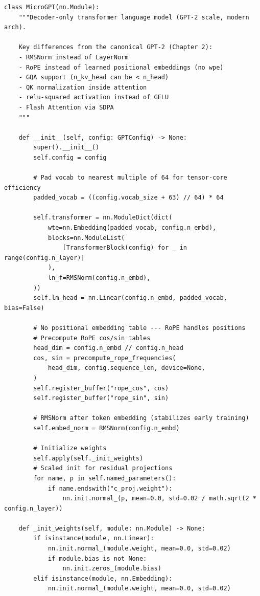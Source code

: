 \begin{lstlisting}
class MicroGPT(nn.Module):
    """Decoder-only transformer language model (GPT-2 scale, modern arch).

    Key differences from the canonical GPT-2 (Chapter 2):
    - RMSNorm instead of LayerNorm
    - RoPE instead of learned positional embeddings (no wpe)
    - GQA support (n_kv_head can be < n_head)
    - QK normalization inside attention
    - relu-squared activation instead of GELU
    - Flash Attention via SDPA
    """

    def __init__(self, config: GPTConfig) -> None:
        super().__init__()
        self.config = config

        # Pad vocab to nearest multiple of 64 for tensor-core efficiency
        padded_vocab = ((config.vocab_size + 63) // 64) * 64

        self.transformer = nn.ModuleDict(dict(
            wte=nn.Embedding(padded_vocab, config.n_embd),
            blocks=nn.ModuleList(
                [TransformerBlock(config) for _ in range(config.n_layer)]
            ),
            ln_f=RMSNorm(config.n_embd),
        ))
        self.lm_head = nn.Linear(config.n_embd, padded_vocab, bias=False)

        # No positional embedding table --- RoPE handles positions
        # Precompute RoPE cos/sin tables
        head_dim = config.n_embd // config.n_head
        cos, sin = precompute_rope_frequencies(
            head_dim, config.sequence_len, device=None,
        )
        self.register_buffer("rope_cos", cos)
        self.register_buffer("rope_sin", sin)

        # RMSNorm after token embedding (stabilizes early training)
        self.embed_norm = RMSNorm(config.n_embd)

        # Initialize weights
        self.apply(self._init_weights)
        # Scaled init for residual projections
        for name, p in self.named_parameters():
            if name.endswith("c_proj.weight"):
                nn.init.normal_(p, mean=0.0, std=0.02 / math.sqrt(2 * config.n_layer))

    def _init_weights(self, module: nn.Module) -> None:
        if isinstance(module, nn.Linear):
            nn.init.normal_(module.weight, mean=0.0, std=0.02)
            if module.bias is not None:
                nn.init.zeros_(module.bias)
        elif isinstance(module, nn.Embedding):
            nn.init.normal_(module.weight, mean=0.0, std=0.02)


\end{lstlisting}
